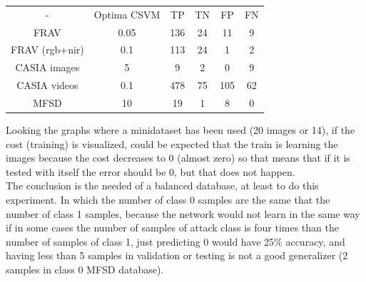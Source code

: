 \begin{table}[htb]
\centering
\label{table-ej1}
\begin{tabular}{cccccc}
-              &Optima CSVM& TP & TN & FP & FN \\
FRAV           &    0.05   & 136& 24 &  11 & 9 \\
FRAV (rgb+nir) &    0.1    & 113& 24 &  1  & 2 \\
CASIA images   &    5      & 9  & 2  &  0  & 9 \\
CASIA videos   &    0.1    & 478& 75 &  105& 62 \\
MFSD           &    10     & 19 &  1 &   8 & 0 \\
\end{tabular}
\end{table}

Looking the graphs where a minidataset has been used (20 images or 14), if the cost (training) is visualized, could be expected that the train is learning the images because the cost decreases to 0 (almost zero) so that means that if it is tested with itself the error should be 0, but that does not happen.\\

The conclusion is the needed of a balanced database, at least to do this experiment. In which the number of class 0 samples are the same that the number of class 1 samples, because the network would not learn in the same way if in some cases the number of samples of  attack class is four times than the number of samples of class 1, just predicting 0 would have 25\% accuracy, and having less than 5 samples in validation or testing is not a good generalizer (2 samples in class 0 MFSD database).\\
